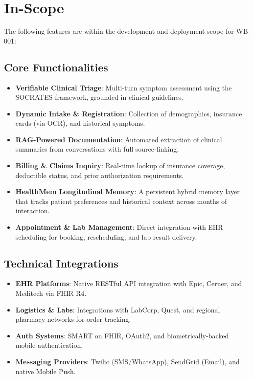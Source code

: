 \documentclass[12pt,a4paper]{article}
\begin{document}
\section{In-Scope}
The following features are within the development and deployment scope for WB-001:

\subsection{Core Functionalities}
\begin{itemize}
    \item \textbf{Verifiable Clinical Triage}: Multi-turn symptom assessment using the SOCRATES framework, grounded in clinical guidelines.
    \item \textbf{Dynamic Intake \& Registration}: Collection of demographics, insurance cards (via OCR), and historical symptoms.
    \item \textbf{RAG-Powered Documentation}: Automated extraction of clinical summaries from conversations with full source-linking.
    \item \textbf{Billing \& Claims Inquiry}: Real-time lookup of insurance coverage, deductible status, and prior authorization requirements.
    \item \textbf{HealthMem Longitudinal Memory}: A persistent hybrid memory layer that tracks patient preferences and historical context across months of interaction.
    \item \textbf{Appointment \& Lab Management}: Direct integration with EHR scheduling for booking, rescheduling, and lab result delivery.
\end{itemize}

\subsection{Technical Integrations}
\begin{itemize}
    \item \textbf{EHR Platforms}: Native RESTful API integration with Epic, Cerner, and Meditech via FHIR R4.
    \item \textbf{Logistics \& Labs}: Integrations with LabCorp, Quest, and regional pharmacy networks for order tracking.
    \item \textbf{Auth Systems}: SMART on FHIR, OAuth2, and biometrically-backed mobile authentication.
    \item \textbf{Messaging Providers}: Twilio (SMS/WhatsApp), SendGrid (Email), and native Mobile Push.
\end{itemize}
\end{document}
